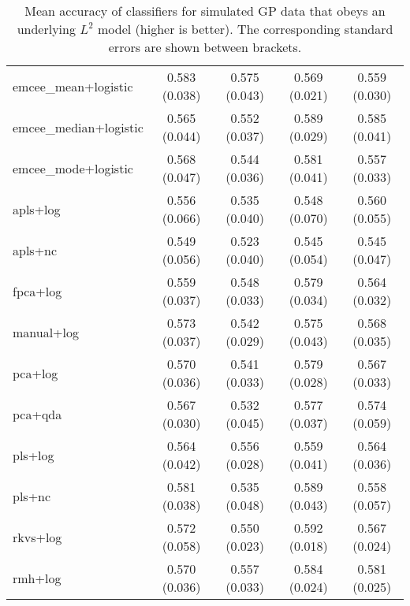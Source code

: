\begin{table}[htbp!]
\begin{tabular}{lcccc}
\bottomrule
\toprule
  emcee\_mean+logistic & 0.583 (0.038) & 0.575 (0.043) & 0.569 (0.021) & 0.559 (0.030) \\
emcee\_median+logistic & 0.565 (0.044) & 0.552 (0.037) & 0.589 (0.029) & 0.585 (0.041) \\
  emcee\_mode+logistic & 0.568 (0.047) & 0.544 (0.036) & 0.581 (0.041) & 0.557 (0.033) \\
             apls+log & 0.556 (0.066) & 0.535 (0.040) & 0.548 (0.070) & 0.560 (0.055) \\
              apls+nc & 0.549 (0.056) & 0.523 (0.040) & 0.545 (0.054) & 0.545 (0.047) \\
             fpca+log & 0.559 (0.037) & 0.548 (0.033) & 0.579 (0.034) & 0.564 (0.032) \\
           manual+log & 0.573 (0.037) & 0.542 (0.029) & 0.575 (0.043) & 0.568 (0.035) \\
              pca+log & 0.570 (0.036) & 0.541 (0.033) & 0.579 (0.028) & 0.567 (0.033) \\
              pca+qda & 0.567 (0.030) & 0.532 (0.045) & 0.577 (0.037) & 0.574 (0.059) \\
              pls+log & 0.564 (0.042) & 0.556 (0.028) & 0.559 (0.041) & 0.564 (0.036) \\
               pls+nc & 0.581 (0.038) & 0.535 (0.048) & 0.589 (0.043) & 0.558 (0.057) \\
             rkvs+log & 0.572 (0.058) & 0.550 (0.023) & 0.592 (0.018) & 0.567 (0.024) \\
              rmh+log & 0.570 (0.036) & 0.557 (0.033) & 0.584 (0.024) & 0.581 (0.025) \\
\bottomrule
\end{tabular}
  \caption{Mean accuracy of classifiers for simulated GP data that obeys an underlying \(L^2\) model (higher is better). The corresponding standard errors are shown between brackets.}
\end{table}

\newpage

